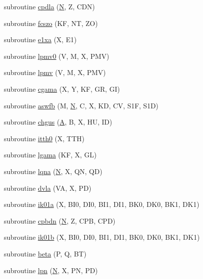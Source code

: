 \begin{DoxyCompactItemize}
subroutine \hyperlink{specfun_8f_adae6a0466c7a1029f00e6a8dc5dc1343}{cpdla} (\hyperlink{polmisc_8c_a0240ac851181b84ac374872dc5434ee4}{N}, Z, C\+D\+N)
\item 
subroutine \hyperlink{specfun_8f_a289f2b44a180fddab0e809da324546be}{fcszo} (K\+F, N\+T, Z\+O)
\item 
subroutine \hyperlink{specfun_8f_ac79a48038bd1fde0ce3eeac4ae431191}{e1xa} (X, E1)
\item 
subroutine \hyperlink{specfun_8f_a633fa1c4df89fee91cde93ed3ae9a03e}{lpmv0} (V, M, X, P\+M\+V)
\item 
subroutine \hyperlink{specfun_8f_a4f513b572289dee048767045326859e4}{lpmv} (V, M, X, P\+M\+V)
\item 
subroutine \hyperlink{specfun_8f_a490d24c6273135c96d2a2c7ed024a5ef}{cgama} (X, Y, K\+F, G\+R, G\+I)
\item 
subroutine \hyperlink{specfun_8f_a8d8ffef796d09a72b5cbb52f32fc7ff4}{aswfb} (M, \hyperlink{polmisc_8c_a0240ac851181b84ac374872dc5434ee4}{N}, C, X, K\+D, C\+V, S1\+F, S1\+D)
\item 
subroutine \hyperlink{specfun_8f_a93731e25174faa7e50086778d43c01b8}{chgus} (\hyperlink{classA}{A}, B, X, H\+U, I\+D)
\item 
subroutine \hyperlink{specfun_8f_a0d9095dfd5ad7ea0d33e17f6431078d3}{itth0} (X, T\+T\+H)
\item 
subroutine \hyperlink{specfun_8f_ae74cd2f6044a9afc29ca9f5cf03a18d9}{lgama} (K\+F, X, G\+L)
\item 
subroutine \hyperlink{specfun_8f_acb61a3f1c1071e811790c0eca04e880a}{lqna} (\hyperlink{polmisc_8c_a0240ac851181b84ac374872dc5434ee4}{N}, X, Q\+N, Q\+D)
\item 
subroutine \hyperlink{specfun_8f_af188c2beb8756c0433ab36748a473a01}{dvla} (V\+A, X, P\+D)
\item 
subroutine \hyperlink{specfun_8f_afa4b810e31b84c4a9a90fab0d062efb7}{ik01a} (X, B\+I0, D\+I0, B\+I1, D\+I1, B\+K0, D\+K0, B\+K1, D\+K1)
\item 
subroutine \hyperlink{specfun_8f_a41bd8b0e174b12c558bae70653e8aecd}{cpbdn} (\hyperlink{polmisc_8c_a0240ac851181b84ac374872dc5434ee4}{N}, Z, C\+P\+B, C\+P\+D)
\item 
subroutine \hyperlink{specfun_8f_a30a1371f3478bccef5d48856ce1aea29}{ik01b} (X, B\+I0, D\+I0, B\+I1, D\+I1, B\+K0, D\+K0, B\+K1, D\+K1)
\item 
subroutine \hyperlink{specfun_8f_a4d410ae9b4a4ee1e3bce2ca6c0e57b68}{beta} (P, Q, B\+T)
\item 
subroutine \hyperlink{specfun_8f_a755d56996ca6571f92653a5ea96e8c44}{lpn} (\hyperlink{polmisc_8c_a0240ac851181b84ac374872dc5434ee4}{N}, X, P\+N, P\+D)

\end{DoxyCompactItemize}
